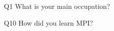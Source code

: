 \begin{description}%
\item{Q1} What is your main occupation?%
\item{Q10} How did you learn MPI?%
\end{description}%

